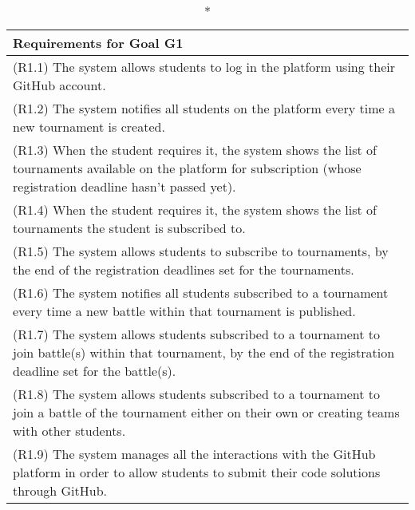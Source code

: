 \begin{longtable}{|p{16.5cm}|}
	\caption*{Requirements for Goal G1}
	\\
	\hline
(R1.1) The system allows students to log in the platform using their GitHub account. \\ 
\hline
(R1.2) The system notifies all students on the platform every time a new tournament is created.\\
\hline
(R1.3) When the student requires it, the system shows the list of tournaments available on the platform for subscription (whose registration deadline hasn't passed yet). \\
\hline
(R1.4) When the student requires it, the system shows the list of tournaments the student is subscribed to.\\
\hline
(R1.5) The system allows students to subscribe to tournaments, by the end of the registration deadlines set for the tournaments.  \\
\hline
(R1.6) The system notifies all students subscribed to a tournament every time a new battle within that tournament is published.  \\
\hline
(R1.7) The system allows students subscribed to a tournament to join battle(s) within that tournament, by the end of the registration deadline set for the battle(s). \\
\hline
(R1.8) The system allows students subscribed to a tournament to join a battle of the tournament either on their own or creating teams with other students.  \\
\hline
(R1.9) The system manages all the interactions with the GitHub platform in order to allow students to submit their code solutions through GitHub.
	

\end{longtable}
